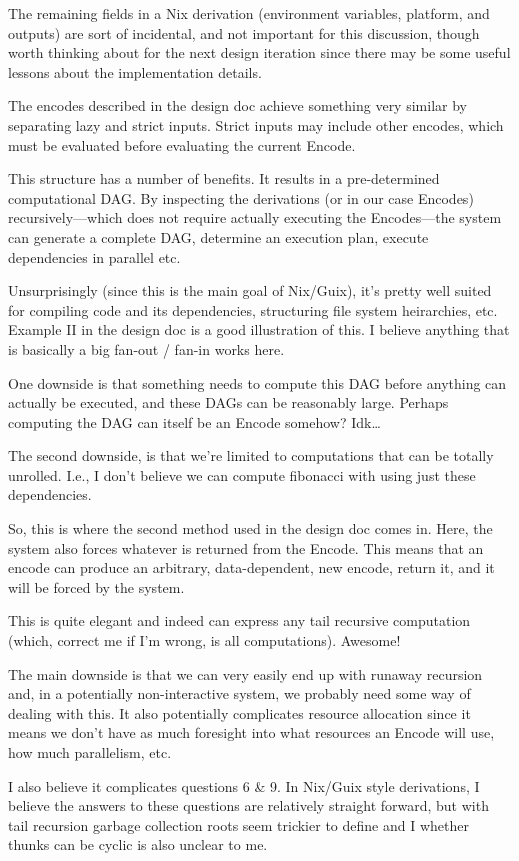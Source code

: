 \documentclass{article}
\newcommand{\bs}{\vspace{\baselineskip}}
\begin{document}
The remaining fields in a Nix derivation (environment variables,
platform, and outputs) are sort of incidental, and not important for
this discussion, though worth thinking about for the next design
iteration since there may be some useful lessons about the
implementation details.

\bs

The encodes described in the design doc achieve something very similar
by separating lazy and strict inputs. Strict inputs may include other
encodes, which must be evaluated before evaluating the current Encode.

\bs

This structure has a number of benefits. It results in a
pre-determined computational DAG. By inspecting the derivations (or in
our case Encodes) recursively---which does not require actually
executing the Encodes---the system can generate a complete DAG,
determine an execution plan, execute dependencies in parallel etc.

\bs

Unsurprisingly (since this is the main goal of Nix/Guix), it's pretty
well suited for compiling code and its dependencies, structuring file
system heirarchies, etc. Example II in the design doc is a good
illustration of this. I believe anything that is basically a big
fan-out / fan-in works here.

\bs

One downside is that something needs to compute this DAG before
anything can actually be executed, and these DAGs can be reasonably
large. Perhaps computing the DAG can itself be an Encode somehow?
Idk\ldots

\bs

The second downside, is that we're limited to computations that can be totally unrolled. I.e., I don't believe we can compute fibonacci with using just these dependencies.

\bs

So, this is where the second method used in the design doc comes
in. Here, the system also forces whatever is returned from the
Encode. This means that an encode can produce an arbitrary,
data-dependent, new encode, return it, and it will be forced by the
system.

\bs

This is quite elegant and indeed can express any tail recursive computation (which, correct me if I'm wrong, is all computations). Awesome!

\bs

The main downside is that we can very easily end up with runaway
recursion and, in a potentially non-interactive system, we probably
need some way of dealing with this. It also potentially complicates
resource allocation since it means we don't have as much foresight
into what resources an Encode will use, how much parallelism, etc.

\bs

I also believe it complicates questions 6 \& 9. In Nix/Guix style
derivations, I believe the answers to these questions are relatively
straight forward, but with tail recursion garbage collection roots
seem trickier to define and I whether thunks can be cyclic is also
unclear to me.
\end{document}
